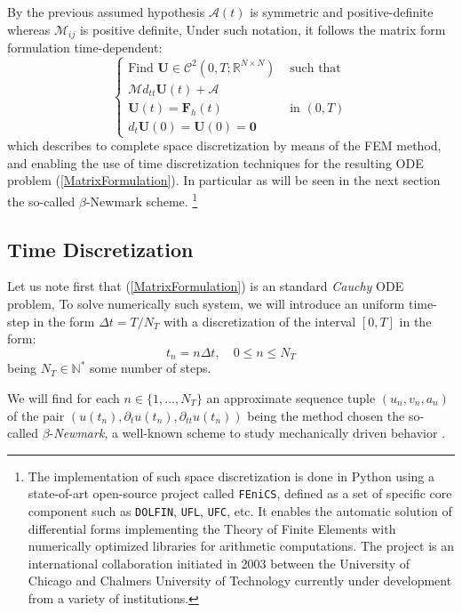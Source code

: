 By the previous assumed hypothesis $\mathcal{A}(t)$ is symmetric and positive-definite whereas $\mathcal{M}_{ij}$ is positive definite, Under such notation, it follows the matrix form formulation time-dependent:
\begin{equation}
    \label{MatrixFormulation}
    \left \{
    \begin{array}{cc}
        \text{Find } \mathbf{U} \in \mathcal{C}^2(0,T; \mathbb{R}^{N\times N}) & \text{ such that} \\
        \mathcal{M} d_{tt} \mathbf{U}(t) + \mathcal{A} \\ \mathbf{U}(t) = \mathbf{F}_h (t) & \text{ in }(0,T) \\
        d_{t} \mathbf{U}(0) = \mathbf{U}(0)  = \mathbf{0}&
    \end{array}
    \right.
\end{equation}
which describes to complete space discretization by means of the FEM method, and enabling the use of time discretization techniques for the resulting ODE problem (\ref{MatrixFormulation}). In particular as will be seen in the next section the so-called $\beta$-Newmark scheme. \footnote{The implementation of such space discretization is done in Python using a state-of-art open-source project called \texttt{FEniCS}, defined as a set of specific core component such as \texttt{DOLFIN}, \texttt{UFL},  \texttt{UFC}, etc. It enables the automatic solution of differential forms implementing the Theory of Finite Elements with numerically optimized libraries for arithmetic computations. The project is an international collaboration initiated in 2003 between the University of Chicago and Chalmers University of Technology currently under development from a variety of institutions.}

\subsection{Time Discretization}
Let us note first that (\ref{MatrixFormulation}) is an standard \textit{Cauchy} ODE problem, To solve numerically such system, we will introduce an uniform time-step in the form $\Delta t = T/N_T$ with a discretization of the interval $[0, T]$ in the form:
\begin{equation*}
    t_n = n \Delta t, \quad 0 \leq n \leq N_T
\end{equation*}
being $N_T \in \mathbb{N}^*$ some number of steps.

We will find for each $n \in \{1,\dots, N_T \}$ an approximate sequence tuple $(u_n, v_n, a_n)$ of the pair $(u(t_n), \partial_{t} u(t_n), \partial_{tt} u(t_n))$ being the method chosen the so-called $\beta$-\textit{Newmark}, a well-known scheme to study mechanically driven behavior \cite{raviart1983introduction}.

